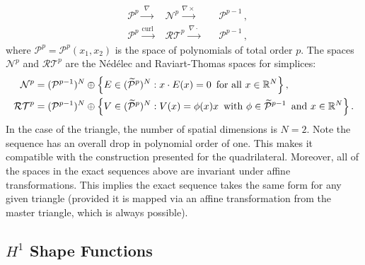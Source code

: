 %
\begin{equation}
\begin{alignedat}{4}
    &\mathcal{P}^p \xrightarrow{\,\,\nabla\,\,} &\mathcal{N}^p \xrightarrow{\nabla\times} && \mathcal{P}^{p-1} \,,\\
    &\mathcal{P}^p \xrightarrow{\mathrm{curl}\,} &\mathcal{RT}^p \xrightarrow{\,\nabla\cdot\,} &&\mathcal{P}^{p-1} \,,
    \label{eq:EStriangle}
\end{alignedat}
\end{equation}
where $\mathcal{P}^p =\mathcal{P}^p(x_1,x_2)$ is the space of polynomials of total order $p$.
The spaces $\mathcal{N}^p$ and $\mathcal{RT}^p$ are the N\'{e}d\'{e}lec and Raviart-Thomas spaces for simplices:
\begin{align}
	\label{eq:NedelecSpace}
	\mathcal{N}^p&=(\mathcal{P}^{p-1})^N\oplus\Big\{E\in(\widetilde{\mathcal{P}}^{p})^N: x\cdot E(x)=0\,\text{ for all } x\in\mathbb{R}^N\Big\}\,,\\
	\label{eq:RaviartThomasSpace}
	\mathcal{RT}^p&=(\mathcal{P}^{p-1})^N\oplus\Big\{V\in(\widetilde{\mathcal{P}}^{p})^N: V(x)=\phi(x)x
		\, \text{ with }\phi\in\widetilde{\mathcal{P}}^{p-1}\,\text{ and }x\in\mathbb{R}^N\Big\} \,.
\end{align}
In the case of the triangle, the number of spatial dimensions is $N=2$.
Note the sequence has an overall drop in polynomial order of one. 
This makes it compatible with the construction presented for the quadrilateral.
Moreover, all of the spaces in the exact sequences above are invariant under affine transformations. 
This implies the exact sequence takes the same form for any given triangle (provided it is mapped via an affine transformation from the master triangle, which is always possible).

\subsection{\texorpdfstring{$H^1$}{H1} Shape Functions}

